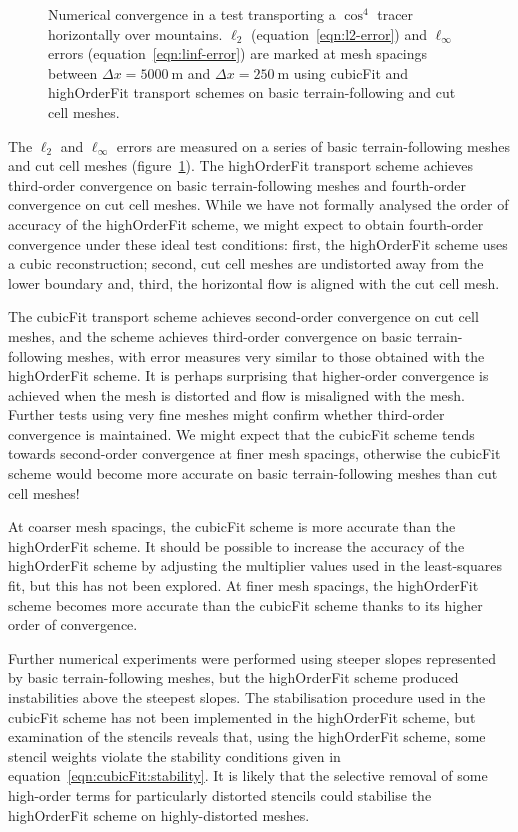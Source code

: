 \begin{figure}
	\centering
	
	\caption{Numerical convergence in a test transporting a $\cos^4$ tracer horizontally over mountains.
	$\ell_2$ (equation~\ref{eqn:l2-error}) and $\ell_\infty$ errors (equation~\ref{eqn:linf-error}) are marked at mesh spacings between $\Delta x = \SI{5000}{\meter}$ and $\Delta x = \SI{250}{\meter}$ using cubicFit and highOrderFit transport schemes on basic terrain-following and cut cell meshes.}
	\label{fig:highOrderFit:schaerAdvectSmooth:convergence}
\end{figure}

The $\ell_2$ and $\ell_\infty$ errors are measured on a series of basic terrain-following meshes and cut cell meshes (figure~\ref{fig:highOrderFit:schaerAdvectSmooth:convergence}).
The highOrderFit transport scheme achieves third-order convergence on basic terrain-following meshes and fourth-order convergence on cut cell meshes.
While we have not formally analysed the order of accuracy of the highOrderFit scheme, we might expect to obtain fourth-order convergence under these ideal test conditions: first, the highOrderFit scheme uses a cubic reconstruction; second, cut cell meshes are undistorted away from the lower boundary and, third, the horizontal flow is aligned with the cut cell mesh.

The cubicFit transport scheme achieves second-order convergence on cut cell meshes, and the scheme achieves third-order convergence on basic terrain-following meshes, with error measures very similar to those obtained with the highOrderFit scheme.
It is perhaps surprising that higher-order convergence is achieved when the mesh is distorted and flow is misaligned with the mesh.
Further tests using very fine meshes might confirm whether third-order convergence is maintained.
We might expect that the cubicFit scheme tends towards second-order convergence at finer mesh spacings, otherwise the cubicFit scheme would become more accurate on basic terrain-following meshes than cut cell meshes!

At coarser mesh spacings, the cubicFit scheme is more accurate than the highOrderFit scheme.
It should be possible to increase the accuracy of the highOrderFit scheme by adjusting the multiplier values used in the least-squares fit, but this has not been explored.
At finer mesh spacings, the highOrderFit scheme becomes more accurate than the cubicFit scheme thanks to its higher order of convergence.

Further numerical experiments were performed using steeper slopes represented by basic terrain-following meshes, but the highOrderFit scheme produced instabilities above the steepest slopes.
The stabilisation procedure used in the cubicFit scheme has not been implemented in the highOrderFit scheme, but examination of the stencils reveals that, using the highOrderFit scheme, some stencil weights violate the stability conditions given in equation~\eqref{eqn:cubicFit:stability}.
It is likely that the selective removal of some high-order terms for particularly distorted stencils could stabilise the highOrderFit scheme on highly-distorted meshes.

